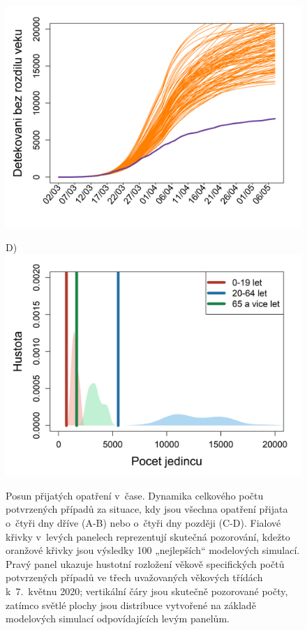 \begin{figure}
\begin{center}
\begin{minipage}[m]{0.45\textwidth}
			\includegraphics[width = \textwidth]{pic/sc_4later.png}
		\end{minipage}
		\begin{minipage}[m]{0.45\textwidth}
			D) \\
			\includegraphics[width = \textwidth]{pic/sc_4later_PDF.png}
		\end{minipage}
	\end{center}
	\caption{Posun přijatých opatření v~čase. Dynamika celkového počtu potvrzených případů za situace, kdy jsou všechna opatření přijata o~čtyři dny dříve (A-B) nebo o~čtyři dny později (C-D). Fialové křivky v~levých panelech reprezentují skutečná pozorování, kdežto oranžové křivky jsou výsledky 100 „nejlepších“ modelových simulací. Pravý panel ukazuje hustotní rozložení věkově specifických počtů potvrzených případů ve třech uvažovaných věkových třídách k~7.\ květnu 2020; vertikální čáry jsou skutečně pozorované počty, zatímco světlé plochy jsou distribuce vytvořené na základě modelových simulací odpovídajících levým panelům.}
	\label{scenariosR1R2}
\end{figure}


